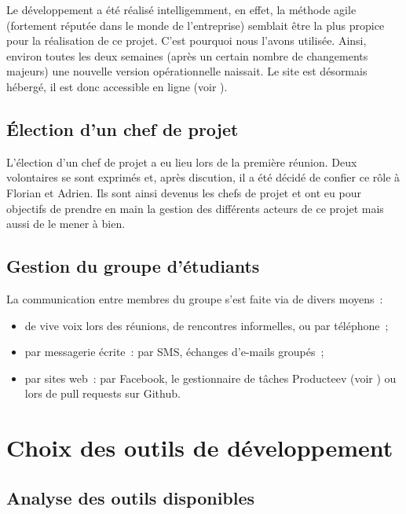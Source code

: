 Le développement a été réalisé intelligemment, en effet, la méthode agile (fortement réputée dans le monde de l'entreprise) semblait être la plus propice pour la réalisation de ce projet. C'est pourquoi nous l'avons utilisée.
Ainsi, environ toutes les deux semaines (après un certain nombre de changements majeurs) une nouvelle version opérationnelle naissait. 
Le site est désormais hébergé, il est donc accessible en ligne (voir \cite{poavre}).

\subsection{Élection d’un chef de projet}

L'élection d'un chef de projet a eu lieu lors de la première réunion. Deux volontaires se sont exprimés et, après discution, il a été décidé de confier ce rôle à Florian et Adrien. Ils sont ainsi devenus les chefs de projet et ont eu pour objectifs de prendre en main la gestion des différents acteurs de ce projet mais aussi de le mener à bien.

\subsection{Gestion du groupe d’étudiants}

La communication entre membres du groupe s'est faite via de divers moyens~:
\begin{itemize}
    \item de vive voix lors des réunions, de rencontres informelles, ou par téléphone~;
    \item par messagerie écrite~: par SMS, échanges d'e-mails groupés~;
    \item par sites web~: par Facebook, le gestionnaire de tâches Producteev (voir \cite{Producteev}) ou lors de pull requests sur Github.
\end{itemize}

\section{Choix des outils de développement}

\subsection{Analyse des outils disponibles}

